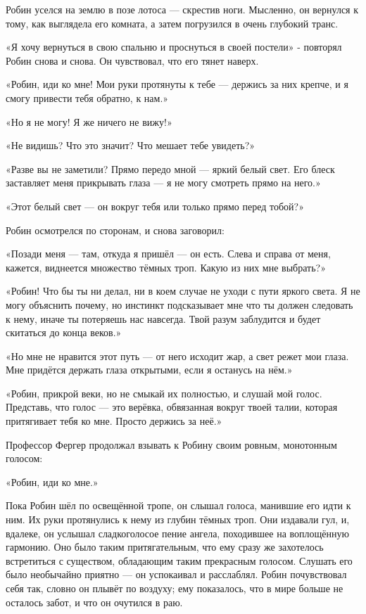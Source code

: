 \documentclass[a4paper,12pt]{book}
\begin{document}
\par
Робин уселся на землю в позе лотоса — скрестив ноги. Мысленно, он вернулся к тому, как выглядела его комната, а затем погрузился в очень глубокий транс.
\par
«Я хочу вернуться в свою спальню и проснуться в своей постели» - повторял Робин снова и снова. Он чувствовал, что его тянет наверх.
\par
«Робин, иди ко мне! Мои руки протянуты к тебе — держись за них крепче, и я смогу привести тебя обратно, к нам.»
\par
«Но я не могу! Я же ничего не вижу!»
\par
«Не видишь? Что это значит? Что мешает тебе увидеть?»
\par
«Разве вы не заметили? Прямо передо мной — яркий белый свет. Его блеск заставляет меня прикрывать глаза — я не могу смотреть прямо на него.»
\par
«Этот белый свет — он вокруг тебя или только прямо перед тобой?»
\par
Робин осмотрелся по сторонам, и снова заговорил:
\par
«Позади меня — там, откуда я пришёл — он есть. Слева и справа от меня, кажется, виднеется множество тёмных троп. Какую из них мне выбрать?»
\par
«Робин! Что бы ты ни делал, ни в коем случае не уходи с пути яркого света. Я не могу объяснить почему, но инстинкт подсказывает мне что ты должен следовать к нему, иначе ты потеряешь нас навсегда. Твой разум заблудится и будет скитаться до конца веков.»
\par
«Но мне не нравится этот путь — от него исходит жар, а свет режет мои глаза. Мне придётся держать глаза открытыми, если я останусь на нём.»
\par
«Робин, прикрой веки, но не смыкай их полностью, и слушай мой голос. Представь, что голос — это верёвка, обвязанная вокруг твоей талии, которая притягивает тебя ко мне. Просто держись за неё.»
\par
Профессор Фергер продолжал взывать к Робину своим ровным, монотонным голосом:
\par
«Робин, иди ко мне.»
\par
Пока Робин шёл по освещённой тропе, он слышал голоса, манившие его идти к ним. Их руки протянулись к нему из глубин тёмных троп. Они издавали гул, и, вдалеке, он услышал сладкоголосое пение ангела, походившее на воплощённую гармонию. Оно было таким притягательным, что ему сразу же захотелось встретиться с существом, обладающим таким прекрасным голосом. Слушать его было необычайно приятно — он успокаивал и расслаблял. Робин почувствовал себя так, словно он плывёт по воздуху; ему показалось, что в мире больше не осталось забот, и что он очутился в раю.
\end{document}
